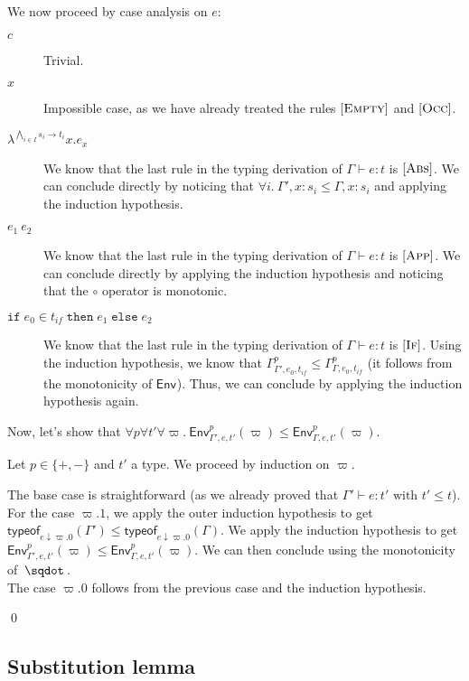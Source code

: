 \documentclass[a4paper]{article}%
\newcommand{\worra}[2]{#1\mathop{\,\sqdot\,} #2}
\newcommand{\ite}[4]{\ensuremath{\texttt{if}\;#1\in#2\;\texttt{then}\;#3\;\texttt{else}\;#4}}
\newcommand{\tyof}[2]{\textsf{typeof}_{#2}(#1)}
\newcommand{\Gp}[2]{\textsf{Env}^{#1}_{#2}}
\theoremstyle{definition}
\newcommand {\Rule}[1] {[\textsc{#1}]}
\begin{document}
    We now proceed by case analysis on $e$:
    \begin{description}
      \item[$c$] Trivial.
      \item[$x$] Impossible case, as we have already treated the rules $\Rule{Empty}$ and $\Rule{Occ}$.
      \item[$\lambda^{\bigwedge_{i\in I} s_i \rightarrow t_i}x.e_x$] We know that the last rule in the typing derivation of $\Gamma \vdash e:t$ is $\Rule {Abs}$.
      We can conclude directly by noticing that $\forall i.\ \Gamma',x:s_i \leq \Gamma,x:s_i$ and applying the induction hypothesis.
      \item[$e_1\ e_2$] We know that the last rule in the typing derivation of $\Gamma \vdash e:t$ is $\Rule {App}$.
      We can conclude directly by applying the induction hypothesis and noticing that the $\circ$ operator is monotonic.
      \item[$\ite {e_0} {t_{if}} {e_1} {e_2}$] We know that the last rule in the typing derivation of $\Gamma \vdash e:t$ is $\Rule {If}$.
      Using the induction hypothesis, we know that $\Gamma^p_{\Gamma',e_0,t_{if}} \leq \Gamma^p_{\Gamma,e_0,t_{if}}$ (it follows from the monotonicity of $\Gp {} {}$).
      Thus, we can conclude by applying the induction hypothesis again.\\
    \end{description}

    Now, let's show that $\forall p \forall t' \forall \varpi.\ \Gp p {\Gamma',e,t'} (\varpi) \leq \Gp p {\Gamma,e,t'} (\varpi)$.

    Let $p\in \{+,-\}$ and $t'$ a type.
    We proceed by induction on $\varpi$.
    
    The base case is straightforward (as we already proved that $\Gamma' \vdash e:t' \text{ with } t' \leq t$).\\
    For the case $\varpi.1$, we apply the outer induction hypothesis to get $\tyof {\Gamma'} {e\downarrow\varpi.0} \leq \tyof {\Gamma} {e\downarrow\varpi.0}$.
    We apply the induction hypothesis to get $\Gp p {\Gamma',e,t'} (\varpi) \leq \Gp p {\Gamma,e,t'} (\varpi)$. We can then conclude using the monotonicity of $\worra {} {}$.\\
    The case $\varpi.0$ follows from the previous case and the induction hypothesis.

    \qed

    \subsection{Substitution lemma}
\end{document}
